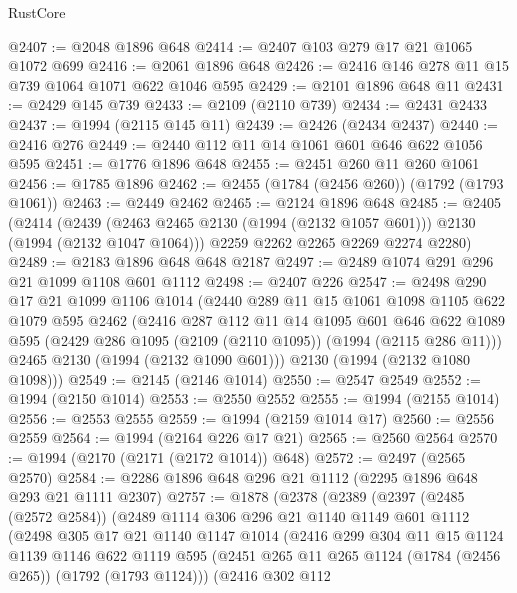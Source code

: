 \begin{lexlean}{RustCore}
\begin{coremodule}
@2407 := @2048 @1896 @648
@2414 := @2407 @103 @279 @17 @21 @1065 @1072 @699
@2416 := @2061 @1896 @648
@2426 := @2416 @146 @278 @11 @15 @739 @1064 @1071 @622 @1046 @595
@2429 := @2101 @1896 @648 @11
@2431 := @2429 @145 @739
@2433 := @2109 (@2110 @739)
@2434 := @2431 @2433
@2437 := @1994 (@2115 @145 @11)
@2439 := @2426 (@2434 @2437)
@2440 := @2416 @276
@2449 := @2440 @112 @11 @14 @1061 @601 @646 @622 @1056 @595
@2451 := @1776 @1896 @648
@2455 := @2451 @260 @11 @260 @1061
@2456 := @1785 @1896
@2462 := @2455 (@1784 (@2456 @260)) (@1792 (@1793 @1061))
@2463 := @2449 @2462
@2465 := @2124 @1896 @648
@2485 := @2405
    (@2414
      (@2439 (@2463 @2465 @2130 (@1994 (@2132 @1057 @601))) @2130 (@1994 (@2132 @1047 @1064)))
      @2259
      @2262
      @2265
      @2269
      @2274
      @2280)
@2489 := @2183 @1896 @648 @648 @2187
@2497 := @2489 @1074 @291 @296 @21 @1099 @1108 @601 @1112
@2498 := @2407 @226
@2547 := @2498
    @290
    @17
    @21
    @1099
    @1106
    @1014
    (@2440
      @289
      @11
      @15
      @1061
      @1098
      @1105
      @622
      @1079
      @595
      @2462
      (@2416
        @287
        @112
        @11
        @14
        @1095
        @601
        @646
        @622
        @1089
        @595
        (@2429 @286 @1095 (@2109 (@2110 @1095)) (@1994 (@2115 @286 @11)))
        @2465
        @2130
        (@1994 (@2132 @1090 @601)))
      @2130
      (@1994 (@2132 @1080 @1098)))
@2549 := @2145 (@2146 @1014)
@2550 := @2547 @2549
@2552 := @1994 (@2150 @1014)
@2553 := @2550 @2552
@2555 := @1994 (@2155 @1014)
@2556 := @2553 @2555
@2559 := @1994 (@2159 @1014 @17)
@2560 := @2556 @2559
@2564 := @1994 (@2164 @226 @17 @21)
@2565 := @2560 @2564
@2570 := @1994 (@2170 (@2171 (@2172 @1014)) @648)
@2572 := @2497 (@2565 @2570)
@2584 := @2286 @1896 @648 @296 @21 @1112 (@2295 @1896 @648 @293 @21 @1111 @2307)
@2757 := @1878
    (@2378
      (@2389
        (@2397
          (@2485 (@2572 @2584))
          (@2489
            @1114
            @306
            @296
            @21
            @1140
            @1149
            @601
            @1112
            (@2498
              @305
              @17
              @21
              @1140
              @1147
              @1014
              (@2416
                @299
                @304
                @11
                @15
                @1124
                @1139
                @1146
                @622
                @1119
                @595
                (@2451 @265 @11 @265 @1124 (@1784 (@2456 @265)) (@1792 (@1793 @1124)))
                (@2416
                  @302
                  @112

\end{coremodule}
\end{lexlean}
